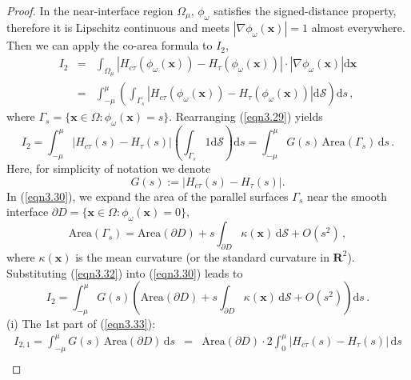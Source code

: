\documentclass[final,hidelinks,onefignum,onetabnum]{siamart251216}
\begin{document}
\begin{proof}
In the near-interface region $\Omega_\mu$, $\phi_\omega$ satisfies the signed-distance property, therefore it is Lipschitz continuous and meets $|\nabla\phi_\omega(\mathbf{x})|=1$ almost everywhere. Then we can apply the co-area formula to $I_2$,
\begin{eqnarray}
I_2&=&\int_{\Omega_\mu} \left| H_{c\tau}(\phi_\omega(\mathbf{x})) - H_\tau(\phi_\omega(\mathbf{x})) \right|\cdot |\nabla\phi_\omega(\mathbf{x})| \mathrm{d}\mathbf{x} \nonumber \\
&=& \int_{-\mu}^{\mu} \left( \int_{\Gamma_s} \left| H_{c\tau}(\phi_\omega(\mathbf{x})) - H_\tau(\phi_\omega(\mathbf{x})) \right|  \mathrm{d}\mathcal{S} \right) \mathrm{d}s\,, \label{eqn3.29}
\end{eqnarray}
where $\Gamma_s = \{ \mathbf{x} \in \Omega : \phi_\omega(\mathbf{x}) = s \}$. Rearranging (\ref{eqn3.29}) yields
\begin{equation}\label{eqn3.30}
I_2= \int_{-\mu}^{\mu}\left| H_{c\tau}(s) - H_\tau(s) \right|  \left( \int_{\Gamma_s} 1 \mathrm{d} \mathcal{S} \right) \mathrm{d}s = \int_{-\mu}^{\mu} G(s)\, \mathrm{Area}(\Gamma_s) \,\mathrm{d}s\,.
\end{equation}
Here,  for simplicity of notation we denote 
\begin{equation}
G(s):=\left| H_{c\tau}(s) - H_\tau(s) \right|.
\end{equation}
In (\ref{eqn3.30}), we expand the area of the parallel surfaces $\Gamma_s$ near the smooth interface $\partial D= \{ \mathbf{x} \in \Omega : \phi_\omega(\mathbf{x}) = 0 \}$,
\begin{equation}\label{eqn3.32}
\mathrm{Area}(\Gamma_s) = \mathrm{Area}(\partial D) + s \int_{\partial D} \kappa(\mathbf{x})\, \mathrm{d}\mathcal{S} + O(s^2)\,,
\end{equation}
where $\kappa(\mathbf{x})$ is the mean curvature (or the standard curvature in $\mathbf{R}^2$). Substituting (\ref{eqn3.32}) into (\ref{eqn3.30}) leads to
\begin{equation}\label{eqn3.33}
I_2 = \int_{-\mu}^{\mu} G(s) \left( \mathrm{Area}(\partial D) + s \int_{\partial D} \kappa(\mathbf{x})\, \mathrm{d}\mathcal{S} + O(s^2) \right) \mathrm{d}s\,.
\end{equation}
(i) The 1st part of (\ref{eqn3.33}):
\begin{eqnarray}
I_{2,1}=\int_{-\mu}^{\mu} G(s) \,\mathrm{Area}(\partial D)\, \mathrm{d}s&=&\mathrm{Area}(\partial D)\cdot 2\int_0^{\mu}\left| H_{c\tau}(s) - H_\tau(s) \right| \, \mathrm{d}s \nonumber \\

\end{eqnarray}
\end{proof}
\end{document}
